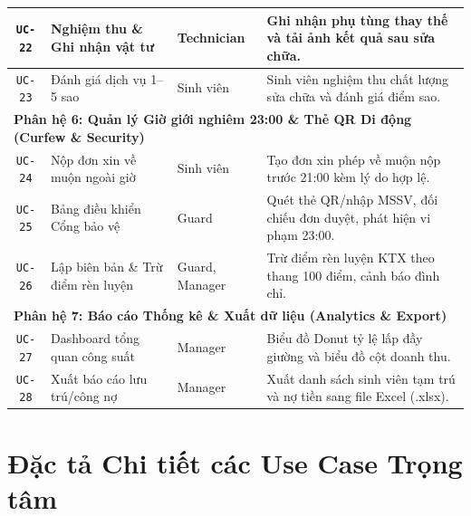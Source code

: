 \begin{table}[htbp]
\begin{tabularx}{\textwidth}{|c|l|l|X|}
\texttt{UC-22} & Nghiệm thu \& Ghi nhận vật tư & Technician & Ghi nhận phụ tùng thay thế và tải ảnh kết quả sau sửa chữa. \\ \hline
\texttt{UC-23} & Đánh giá dịch vụ 1--5 sao & Sinh viên & Sinh viên nghiệm thu chất lượng sửa chữa và đánh giá điểm sao. \\ \hline
\multicolumn{4}{|l|}{\textbf{Phân hệ 6: Quản lý Giờ giới nghiêm 23:00 \& Thẻ QR Di động (Curfew \& Security)}} \\ \hline
\texttt{UC-24} & Nộp đơn xin về muộn ngoài giờ & Sinh viên & Tạo đơn xin phép về muộn nộp trước 21:00 kèm lý do hợp lệ. \\ \hline
\texttt{UC-25} & Bảng điều khiển Cổng bảo vệ & Guard & Quét thẻ QR/nhập MSSV, đối chiếu đơn duyệt, phát hiện vi phạm 23:00. \\ \hline
\texttt{UC-26} & Lập biên bản \& Trừ điểm rèn luyện & Guard, Manager & Trừ điểm rèn luyện KTX theo thang 100 điểm, cảnh báo đình chỉ. \\ \hline
\multicolumn{4}{|l|}{\textbf{Phân hệ 7: Báo cáo Thống kê \& Xuất dữ liệu (Analytics \& Export)}} \\ \hline
\texttt{UC-27} & Dashboard tổng quan công suất & Manager & Biểu đồ Donut tỷ lệ lấp đầy giường và biểu đồ cột doanh thu. \\ \hline
\texttt{UC-28} & Xuất báo cáo lưu trú/công nợ & Manager & Xuất danh sách sinh viên tạm trú và nợ tiền sang file Excel (.xlsx). \\ \hline
\end{tabularx}
\end{table}

\section{Đặc tả Chi tiết các Use Case Trọng tâm}

